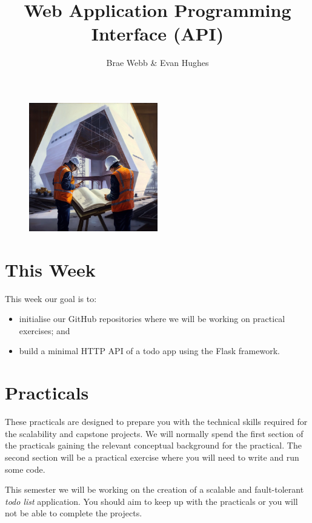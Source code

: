 \documentclass{csse4400}
\title{Web Application Programming Interface (API)}
\author{Brae Webb \& Evan Hughes}
\date{\week[practical]{1}}
\begin{document}
\maketitle

\begin{figure}[h]
    \centering
    \includegraphics[width=0.5\textwidth]{images/header}
\end{figure}


\section{This Week}
This week our goal is to:
\begin{itemize}
  \item initialise our GitHub repositories where we will be working on practical exercises; and
  \item build a minimal HTTP API of a todo app using the Flask framework.
\end{itemize}

\section{Practicals}
These practicals are designed to prepare you with the technical skills required for the scalability and capstone projects.
We will normally spend the first section of the practicals gaining the relevant conceptual background for the practical.
The second section will be a practical exercise where you will need to write and run some code.

This semester we will be working on the creation of a scalable and fault-tolerant \textsl{todo list} application.
You should aim to keep up with the practicals or you will not be able to complete the projects.
\end{document}
